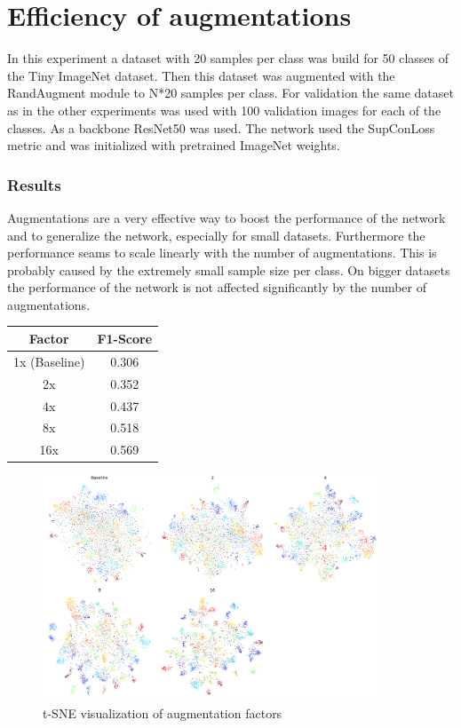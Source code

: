 \documentclass[12pt,a4paper]{report}
\newcommand{\splitlayout}[2]{
	\begin{minipage}{0.6\textwidth}
		#1
	\end{minipage}
	\hfill
	\begin{minipage}{0.35\textwidth}
		#2
	\end{minipage}	
}
\begin{document}
\newpage

\section{Efficiency of augmentations}

In this experiment a dataset with 20 samples per class was build for 50 classes of the Tiny ImageNet dataset.
Then this dataset was augmented with the RandAugment module to N*20 samples per class.
For validation the same dataset as in the other experiments was used with 100 validation images for each of the classes.
As a backbone ResNet50 was used.
The network used the SupConLoss metric and was initialized with pretrained ImageNet weights.

\subsubsection{Results}
\splitlayout{
	Augmentations are a very effective way to boost the performance of the network and 
	to generalize the network,
	especially for small datasets.
	Furthermore the performance seams to scale linearly with the number of augmentations.
	This is probably caused by the extremely small sample size per class.
	On bigger datasets the performance of the network is not affected significantly by the number of augmentations.
}{
	\begin{tabular}{ | c | c | }
		\hline
		Factor &  F1-Score \\ 
		\hline
		1x (Baseline) &  0.306  \\ 
		\hline
		2x & 0.352 \\ 
		\hline
		4x & 0.437 \\ 
		\hline
		8x & 0.518 \\ 
		\hline
		16x & 0.569  \\ 
		\hline
	\end{tabular}
}

\begin{figure}[hb]
	\centering
	\includegraphics[width=0.9\textwidth]{../plots/augmentation_size.png}
	\caption{t-SNE visualization of augmentation factors}
\end{figure}
\end{document}
